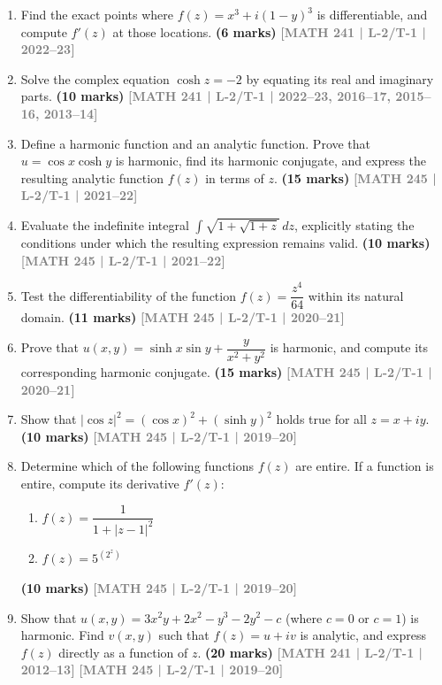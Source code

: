 \documentclass[12pt]{article}
\newcommand{\yr}[1]{\hfill\textcolor{gray}{\small\textbf{[#1]}}}
\newcommand{\mk}[1]{\textcolor{orange!70!black}{\small\textbf{(#1 marks)}}}
\begin{document}
\begin{enumerate}
\item Find the exact points where $f(z)=x^{3}+i(1-y)^{3}$ is differentiable, and compute $f'(z)$ at those locations.
\mk{6} \yr{MATH 241 | L-2/T-1 | 2022--23}


\item Solve the complex equation $\cosh z=-2$ by equating its real and imaginary parts.
\mk{10} \yr{MATH 241 | L-2/T-1 | 2022--23, 2016--17, 2015--16, 2013--14}

\item Define a harmonic function and an analytic function. Prove that $u=\cos x\cosh y$ is harmonic, find its harmonic conjugate, and express the resulting analytic function $f(z)$ in terms of $z$.
\mk{15} \yr{MATH 245 | L-2/T-1 | 2021--22}


\item Evaluate the indefinite integral $\displaystyle\int\sqrt{1+\sqrt{1+z}}\,dz$, explicitly stating the conditions under which the resulting expression remains valid.
\mk{10} \yr{MATH 245 | L-2/T-1 | 2021--22}


\item Test the differentiability of the function $f(z)=\dfrac{z^{4}}{64}$ within its natural domain.
\mk{11} \yr{MATH 245 | L-2/T-1 | 2020--21}


\item Prove that $u(x,y)=\sinh x\sin y+\dfrac{y}{x^{2}+y^{2}}$ is harmonic, and compute its corresponding harmonic conjugate.
\mk{15} \yr{MATH 245 | L-2/T-1 | 2020--21}


\item Show that $|\cos z|^{2}=(\cos x)^{2}+(\sinh y)^{2}$ holds true for all $z=x+iy$.
\mk{10} \yr{MATH 245 | L-2/T-1 | 2019--20}



\item Determine which of the following functions $f(z)$ are entire. If a function is entire, compute its derivative $f'(z)$:
\begin{enumerate}
  \item $f(z)=\dfrac{1}{1+|z-1|^{2}}$
  \item $f(z)=5^{(2^{z})}$
\end{enumerate}
\mk{10} \yr{MATH 245 | L-2/T-1 | 2019--20}

\item Show that $u(x,y)=3x^{2}y+2x^{2}-y^{3}-2y^{2}-c$ (where $c=0$ or $c=1$) is harmonic. Find $v(x,y)$ such that $f(z)=u+iv$ is analytic, and express $f(z)$ directly as a function of $z$.
\mk{20} \yr{MATH 241 | L-2/T-1 | 2012--13} \yr{MATH 245 | L-2/T-1 | 2019--20}


\end{enumerate}
\end{document}
